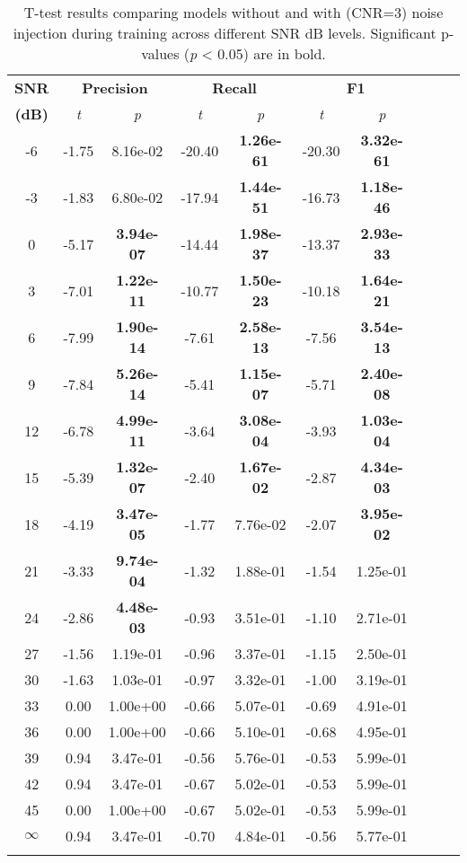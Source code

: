 \documentclass{article}
\begin{document}
\begin{table}[h!]
\centering
\caption{T-test results comparing models without and with (CNR=3) noise injection during training across different SNR dB levels. Significant p-values (\textit{p} < 0.05) are in bold.}
\scriptsize
\begin{tabular}{@{}c ccc ccc ccc@{}} %
\toprule
\textbf{SNR} & \multicolumn{2}{c}{\textbf{Precision}} & \multicolumn{2}{c}{\textbf{Recall}} & \multicolumn{2}{c}{\textbf{F1}} \\ 
\textbf{(dB)} & \textit{t} & \textit{p} & \textit{t} & \textit{p} & \textit{t} & \textit{p} \\
\midrule
-6  & -1.75  & 8.16e-02  & -20.40  & \textbf{1.26e-61}  & -20.30  & \textbf{3.32e-61} \\
-3  & -1.83  & 6.80e-02  & -17.94  & \textbf{1.44e-51}  & -16.73  & \textbf{1.18e-46} \\
0   & -5.17  & \textbf{3.94e-07}  & -14.44  & \textbf{1.98e-37}  & -13.37  & \textbf{2.93e-33} \\
3   & -7.01  & \textbf{1.22e-11}  & -10.77  & \textbf{1.50e-23}  & -10.18  & \textbf{1.64e-21} \\
6   & -7.99  & \textbf{1.90e-14}  & -7.61   & \textbf{2.58e-13}  & -7.56   & \textbf{3.54e-13} \\
9   & -7.84  & \textbf{5.26e-14}  & -5.41   & \textbf{1.15e-07}  & -5.71   & \textbf{2.40e-08} \\
12  & -6.78  & \textbf{4.99e-11}  & -3.64   & \textbf{3.08e-04}  & -3.93   & \textbf{1.03e-04} \\
15  & -5.39  & \textbf{1.32e-07}  & -2.40   & \textbf{1.67e-02}  & -2.87   & \textbf{4.34e-03} \\
18  & -4.19  & \textbf{3.47e-05}  & -1.77   & 7.76e-02  & -2.07   & \textbf{3.95e-02} \\
21  & -3.33  & \textbf{9.74e-04}  & -1.32   & 1.88e-01  & -1.54   & 1.25e-01 \\
24  & -2.86  & \textbf{4.48e-03}  & -0.93   & 3.51e-01  & -1.10   & 2.71e-01 \\
27  & -1.56  & 1.19e-01  & -0.96   & 3.37e-01  & -1.15   & 2.50e-01 \\
30  & -1.63  & 1.03e-01  & -0.97   & 3.32e-01  & -1.00   & 3.19e-01 \\
33  & 0.00   & 1.00e+00  & -0.66   & 5.07e-01  & -0.69   & 4.91e-01 \\
36  & 0.00   & 1.00e+00  & -0.66   & 5.10e-01  & -0.68   & 4.95e-01 \\
39  & 0.94   & 3.47e-01  & -0.56   & 5.76e-01  & -0.53   & 5.99e-01 \\
42  & 0.94   & 3.47e-01  & -0.67   & 5.02e-01  & -0.53   & 5.99e-01 \\
45  & 0.00   & 1.00e+00  & -0.67   & 5.02e-01  & -0.53   & 5.99e-01 \\
$\infty$ & 0.94   & 3.47e-01  & -0.70   & 4.84e-01  & -0.56   & 5.77e-01 \\
\bottomrule
\label{tab:1}
\end{tabular}
\end{table}
\end{document}
